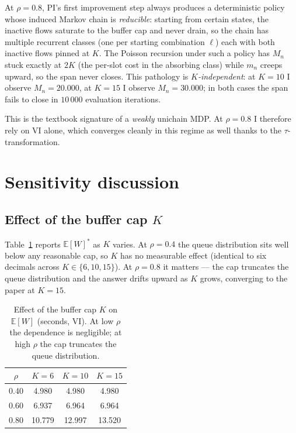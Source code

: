 \documentclass[11pt,a4paper]{article}
\newcommand{\E}{\mathbb{E}}
\begin{document}
At $\rho = 0.8$, PI's first improvement step always produces a
deterministic policy whose induced Markov chain is \emph{reducible}:
starting from certain states, the inactive flows saturate to the
buffer cap and never drain, so the chain has multiple recurrent
classes (one per starting combination $\ell$) each with both inactive
flows pinned at $K$. The Poisson recursion under such a policy has
$M_n$ stuck exactly at $2 K$ (the per-slot cost in the absorbing
class) while $m_n$ creeps upward, so the span never closes. This
pathology is \emph{$K$-independent}: at $K = 10$ I observe $M_n =
20.000$, at $K = 15$ I observe $M_n = 30.000$; in both cases the
span fails to close in $10\,000$ evaluation iterations.

This is the textbook signature of a \emph{weakly} unichain MDP. At
$\rho = 0.8$ I therefore rely on VI alone, which converges cleanly
in this regime as well thanks to the $\tau$-transformation.

\section{Sensitivity discussion}
\label{sec:discuss}

\subsection{Effect of the buffer cap $K$}

Table~\ref{tab:K} reports $\E[W]^*$ as $K$ varies. At $\rho = 0.4$
the queue distribution sits well below any reasonable cap, so $K$
has no measurable effect (identical to six decimals across $K \in
\{6, 10, 15\}$). At $\rho = 0.8$ it matters --- the cap truncates
the queue distribution and the answer drifts upward as $K$ grows,
converging to the paper at $K = 15$.

\begin{table}[h]
\centering
\caption{Effect of the buffer cap $K$ on $\E[W]$ (seconds, VI). At
low $\rho$ the dependence is negligible; at high $\rho$ the cap
truncates the queue distribution.}
\label{tab:K}
\begin{tabular}{cccc}
\toprule
$\rho$ & $K = 6$ & $K = 10$ & $K = 15$ \\
\midrule
0.40 & 4.980  & 4.980  & 4.980  \\
0.60 & 6.937  & 6.964  & 6.964  \\
0.80 & 10.779 & 12.997 & 13.520 \\
\bottomrule
\end{tabular}
\end{table}
\end{document}
